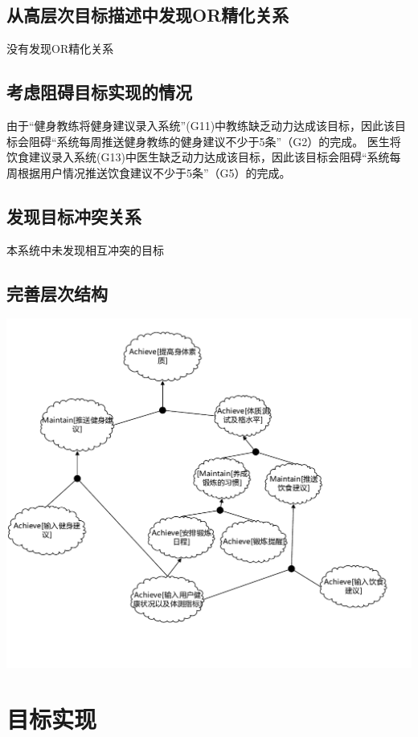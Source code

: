 \documentclass[UTF8]{ctexart}
\begin{document}
\subsection{从高层次目标描述中发现OR精化关系}
没有发现OR精化关系
\subsection{考虑阻碍目标实现的情况}
由于“健身教练将健身建议录入系统”(G11)中教练缺乏动力达成该目标，因此该目标会阻碍“系统每周推送健身教练的健身建议不少于5条”（G2）的完成。
医生将饮食建议录入系统(G13)中医生缺乏动力达成该目标，因此该目标会阻碍“系统每周根据用户情况推送饮食建议不少于5条”（G5）的完成。
\subsection{发现目标冲突关系}
本系统中未发现相互冲突的目标
\subsection{完善层次结构}

\includegraphics[scale=0.90]{goalModel.pdf}

\section{目标实现}
\end{document}
